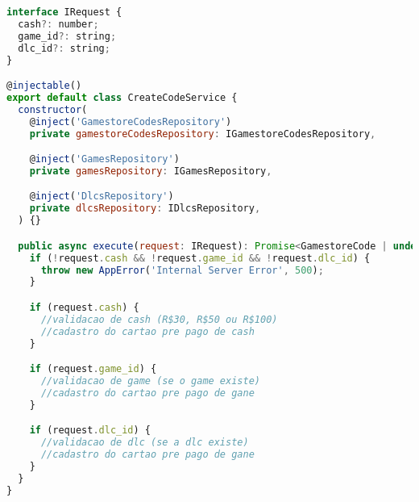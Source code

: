 \begin{lstlisting}[language=JavaScript, caption={Implementação que viola o OCP},captionpos=b, label=alg:ocpviolation]
interface IRequest {
  cash?: number;
  game_id?: string;
  dlc_id?: string;
}

@injectable()
export default class CreateCodeService {
  constructor(
    @inject('GamestoreCodesRepository')
    private gamestoreCodesRepository: IGamestoreCodesRepository,

    @inject('GamesRepository')
    private gamesRepository: IGamesRepository,

    @inject('DlcsRepository')
    private dlcsRepository: IDlcsRepository,
  ) {}

  public async execute(request: IRequest): Promise<GamestoreCode | undefined> {
    if (!request.cash && !request.game_id && !request.dlc_id) {
      throw new AppError('Internal Server Error', 500);
    }

    if (request.cash) {
      //validacao de cash (R$30, R$50 ou R$100)
      //cadastro do cartao pre pago de cash
    }

    if (request.game_id) {
      //validacao de game (se o game existe)
      //cadastro do cartao pre pago de gane
    }

    if (request.dlc_id) {
      //validacao de dlc (se a dlc existe)
      //cadastro do cartao pre pago de gane
    }
  }
}
\end{lstlisting}